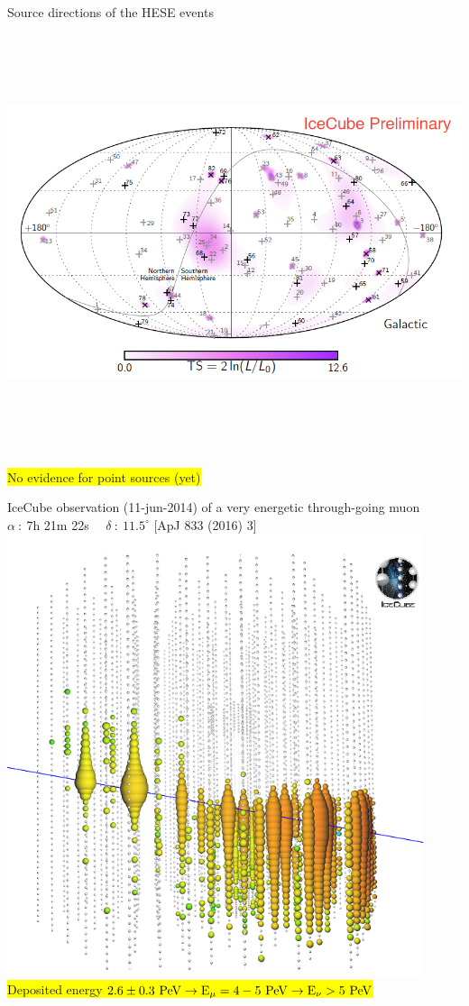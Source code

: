 \Tr
\onecolumn
\begin{center}
{\blue Source directions of the HESE events}\\[3mm]
\includegraphics[keepaspectratio,height=13cm]{hese-skymap-gal-6yr}\\
\colorbox{yellow}{No evidence for point sources (yet)}
\end{center}

\Tr
\onecolumn
\begin{center}
{\blue IceCube observation (11-jun-2014) of a very energetic through-going muon}\\
$\alpha~:~$7h 21m 22s $\quad \delta~:~11.5^{\circ}$ {\large [ApJ 833 (2016) 3]}\\
\includegraphics[keepaspectratio,height=13cm]{multi-pev-muon}\\
\colorbox{yellow}{Deposited energy $2.6 \pm 0.3~\rm{PeV} \rightarrow E_{\mu}=4-5~\rm{PeV} \rightarrow E_{\nu}>5~\rm{PeV}$}
\end{center}
